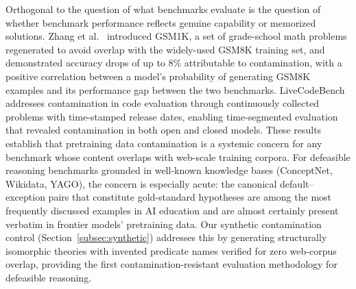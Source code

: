 \documentclass{article}
\theoremstyle{definition}
\begin{document}
Orthogonal to the question of what benchmarks evaluate is the question of whether benchmark performance reflects genuine capability or memorized solutions. Zhang et al.\ \cite{zhang2024gsm1k} introduced GSM1K, a set of grade-school math problems regenerated to avoid overlap with the widely-used GSM8K training set, and demonstrated accuracy drops of up to 8\% attributable to contamination, with a positive correlation between a model's probability of generating GSM8K examples and its performance gap between the two benchmarks. LiveCodeBench \cite{jain2025livecodebench} addresses contamination in code evaluation through continuously collected problems with time-stamped release dates, enabling time-segmented evaluation that revealed contamination in both open and closed models. These results establish that pretraining data contamination is a systemic concern for any benchmark whose content overlaps with web-scale training corpora. For defeasible reasoning benchmarks grounded in well-known knowledge bases (ConceptNet, Wikidata, YAGO), the concern is especially acute: the canonical default--exception pairs that constitute gold-standard hypotheses are among the most frequently discussed examples in AI education and are almost certainly present verbatim in frontier models' pretraining data. Our synthetic contamination control (Section~\ref{subsec:synthetic}) addresses this by generating structurally isomorphic theories with invented predicate names verified for zero web-corpus overlap, providing the first contamination-resistant evaluation methodology for defeasible reasoning.
\end{document}
